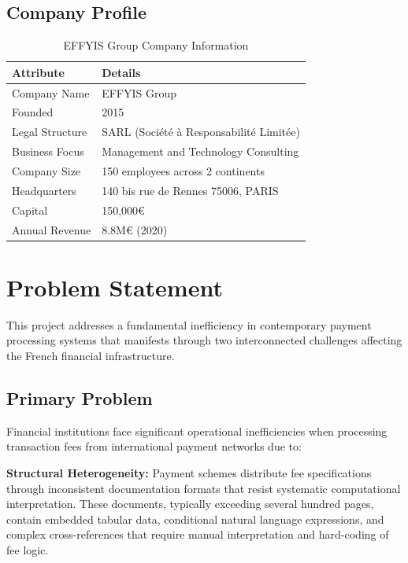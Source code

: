 \subsection{Company Profile}

\begin{table}[ht]
    \centering
    \begin{tabular}{|l|l|}
        \hline
        \textbf{Attribute} & \textbf{Details} \\
        \hline
        Company Name & EFFYIS Group \\
        \hline
        Founded & 2015 \\
        \hline
        Legal Structure & SARL (Société à Responsabilité Limitée) \\
        \hline
        Business Focus & Management and Technology Consulting \\
        \hline
        Company Size & 150 employees across 2 continents \\
        \hline
        Headquarters & 140 bis rue de Rennes 75006, PARIS \\
        \hline
        Capital & 150,000€ \\
        \hline
        Annual Revenue & 8.8M€ (2020) \\
        \hline
    \end{tabular}
    \caption{EFFYIS Group Company Information}
\end{table}


\section{Problem Statement}

This project addresses a fundamental inefficiency in contemporary payment processing systems that manifests through two interconnected challenges affecting the French financial infrastructure.

\subsection{Primary Problem}

Financial institutions face significant operational inefficiencies when processing transaction fees from international payment networks due to:

\textbf{Structural Heterogeneity:} Payment schemes distribute fee specifications through inconsistent documentation formats that resist systematic computational interpretation. These documents, typically exceeding several hundred pages, contain embedded tabular data, conditional natural language expressions, and complex cross-references that require manual interpretation and hard-coding of fee logic.

